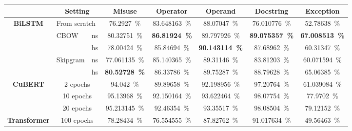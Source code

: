 \documentclass{article}
\newcommand{\BERTforCode}{CuBERT\xspace}
\begin{document}
\begin{table*}
    \centering
{}\begin{tabular}{lll|ccccc}
\toprule
 & \multicolumn{2}{c|}{\textbf{Setting}}             & \textbf{Misuse} & \textbf{Operator} & \textbf{Operand} & \textbf{Docstring} & \textbf{Exception} \\ \midrule 
\multicolumn{1}{c}{\multirow{4}{*}{\textbf{BiLSTM}}} & \multicolumn{2}{l|}{From scratch} &
\SI{76.2927}{\percent}&	\SI{83.648163}{\percent}&	\SI{88.07047}{\percent}&	\SI{76.010776}{\percent}&	\SI{52.78638}{\percent}
\\ \cline{2-3}
& \multirow{2}{*}{CBOW}     & ns &
\SI{80.32751}{\percent}&	\textbf{\SI{86.81924}{\percent}}&	\SI{89.797926}{\percent}&	\textbf{\SI{89.075357}{\percent}}&	\textbf{\SI{67.008513}{\percent}}
\\
\multirow{2}{*}{(\num{100} epochs)}                                                       &                                    & hs &
\SI{78.00424}{\percent}&	\SI{85.84694}{\percent}&	\textbf{\SI{90.143114}{\percent}}&	\SI{87.68962}{\percent}&	\SI{60.31347}{\percent}
\\ \cline{2-3} 
                                                       & \multirow{2}{*}{Skipgram} & ns &
\SI{77.061135}{\percent}&	\SI{85.140365}{\percent}&	\SI{89.31146}{\percent}&	\SI{83.81203}{\percent}&	\SI{60.071594}{\percent}
\\ 
                                                       &                                    & hs &
\textbf{\SI{80.52728}{\percent}}&	\SI{86.33786}{\percent}&	\SI{89.75287}{\percent}&	\SI{88.79628}{\percent}&	\SI{65.06385}{\percent}
\\ \midrule
\multicolumn{1}{c}{\multirow{3}{*}{\textbf{\BERTforCode}}}                                 & \multicolumn{2}{c|}{\num{2} epochs}                           & 
\SI{94.042}{\percent}&	\SI{89.89658}{\percent}&	\SI{92.198956}{\percent}&	\SI{97.20764}{\percent}&	\SI{61.039084}{\percent}
\\
    & \multicolumn{2}{c|}{\num{10} epochs}                          &
\SI{95.13968}{\percent}&	\SI{92.150164}{\percent}&	\SI{93.622464}{\percent}&	\SI{98.07754}{\percent}&	\SI{77.9702}{\percent}
\\
    & \multicolumn{2}{c|}{\num{20} epochs}                          &
\SI{95.213145}{\percent}&	\SI{92.46354}{\percent}&	\SI{93.35517}{\percent}&	\SI{98.08504}{\percent}&	\SI{79.12152}{\percent}
\\ \midrule
    \textbf{Transformer} & \multicolumn{2}{c|}{\num{100} epochs} &
\SI{78.28434}{\percent}&	\SI{76.554555}{\percent}&	\SI{87.82762}{\percent}&	\SI{91.017634}{\percent}&	\SI{49.56463}{\percent}
\\
    \bottomrule
\end{tabular}




\end{table*}
\end{document}
